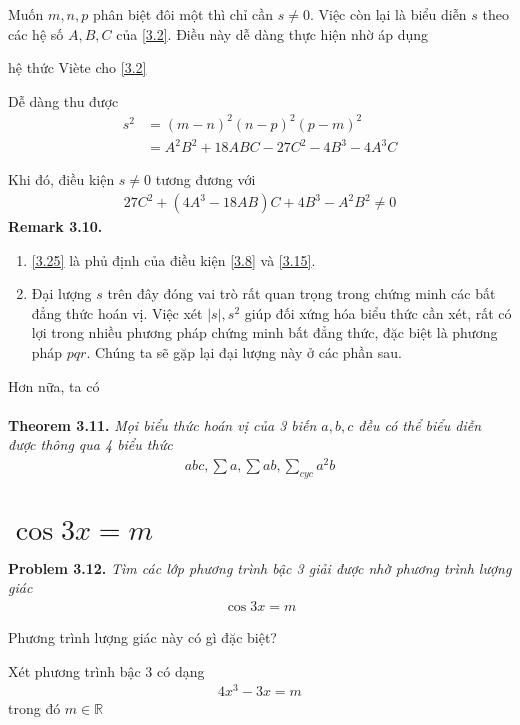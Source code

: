 \documentclass[a4paper,oneside]{book}
\numberwithin{equation}{chapter}
\begin{document}
Muốn $m,n,p$ phân biệt đôi một thì chỉ cần $s \ne 0$. Việc còn lại là biểu diễn $s$ theo các hệ số $A,B,C$ của \eqref{3.2}. Điều này dễ dàng thực hiện nhờ áp dụng {hệ thức Vi\`{e}te cho \eqref{3.2}

Dễ dàng thu được
\begin{align}
{s^2} &= {\left( {m - n} \right)^2}{\left( {n - p} \right)^2}{\left( {p - m} \right)^2}\\
 &= {A^2}{B^2} + 18ABC - 27{C^2} - 4{B^3} - 4{A^3}C
\end{align}

Khi đó, điều kiện $s \ne 0$ tương đương với
\begin{align}
\label{3.25}
27{C^2} + \left( {4{A^3} - 18AB} \right)C + 4{B^3} - {A^2}{B^2} \ne 0
\end{align}
\textbf{Remark 3.10.}
\begin{enumerate}
\item \eqref{3.25} là phủ định của điều kiện \eqref{3.8} và \eqref{3.15}.
\item Đại lượng $s$ trên đây đóng vai trò rất quan trọng trong chứng minh các bất đẳng thức hoán vị. Việc xét $\left| s \right|,{s^2}$ giúp đối xứng hóa biểu thức cần xét, rất có lợi trong nhiều phương pháp chứng minh bất đẳng thức, đặc biệt là phương pháp $pqr$. Chúng ta sẽ gặp lại đại lượng này ở các phần sau.
\end{enumerate}

Hơn nữa, ta có\\
\\
\textbf{Theorem 3.11.} \textit{Mọi biểu thức hoán vị của 3 biến $a,b,c$ đều có thể biểu diễn được thông qua 4 biểu thức}
\begin{align}
abc,\sum a ,\sum {ab} ,\sum\limits_{cyc} {{a^2}b}
\end{align}
\section{$\cos 3x = m$}
\textbf{Problem 3.12.} \textit{Tìm các lớp phương trình bậc 3 giải được nhờ phương trình lượng giác}
\begin{align}
\cos 3x = m
\end{align}

Phương trình lượng giác này có gì đặc biệt? 

Xét phương trình bậc 3 có dạng
\begin{align}
\label{3.27}
4{x^3} - 3x = m
\end{align}
trong đó $m \in \mathbb{R}$

}
\end{document}
